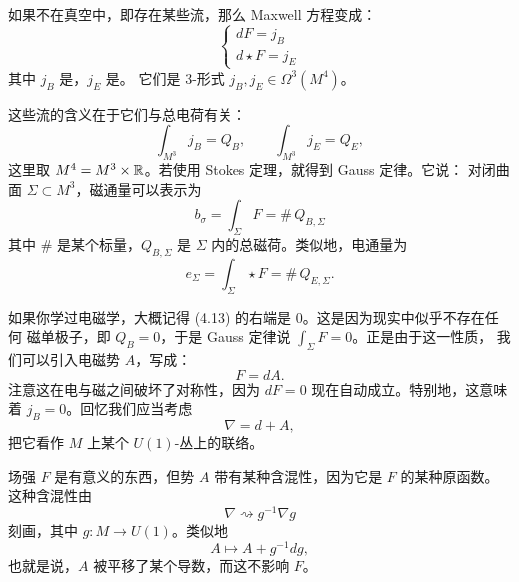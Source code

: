 如果不在真空中，即存在某些流，那么 Maxwell 方程变成：
\begin{equation}\tag{4.11}
\begin{cases}
dF=j_{B}\\
d\star F=j_{E}
\end{cases}
\end{equation}
其中 $j_{B}$ 是，$j_{E}$ 是。
它们是 3-形式 $j_{B},j_{E}\in\Omega^{3}(M^{4})$。

这些流的含义在于它们与总电荷有关：
\begin{equation}\tag{4.12}
\int_{M^{3}}j_{B}=Q_{B},
\qquad
\int_{M^{3}}j_{E}=Q_{E},
\end{equation}
这里取 $M^{4}=M^{3}\times\mathbb{R}$。若使用 Stokes 定理，就得到 Gauss 定律。它说：
对闭曲面 $\Sigma\subset M^{3}$，磁通量可以表示为
\begin{equation}\tag{4.13}
b_{\sigma}=\int_{\Sigma}F=\#\,Q_{B,\Sigma}
\end{equation}
其中 $\#$ 是某个标量，$Q_{B,\Sigma}$ 是 $\Sigma$ 内的总磁荷。类似地，电通量为
\begin{equation}\tag{4.14}
e_{\Sigma}=\int_{\Sigma}\star F=\#\,Q_{E,\Sigma}.
\end{equation}


如果你学过电磁学，大概记得 (4.13) 的右端是 0。这是因为现实中似乎不存在任何
磁单极子，即 $Q_{B}=0$，于是 Gauss 定律说 $\int_{\Sigma}F=0$。正是由于这一性质，
我们可以引入电磁势 $A$，写成：
\begin{equation}\tag{4.15}
F=dA.
\end{equation}
注意这在电与磁之间破坏了对称性，因为 $dF=0$ 现在自动成立。特别地，这意味着
$j_{B}=0$。回忆我们应当考虑
\begin{equation}\tag{4.16}
\nabla=d+A,
\end{equation}
把它看作 $M$ 上某个 $U(1)$-丛上的联络。

场强 $F$ 是有意义的东西，但势 $A$ 带有某种含混性，因为它是 $F$ 的某种原函数。
这种含混性由
\begin{equation}\tag{4.17}
\nabla\rightsquigarrow g^{-1}\nabla g
\end{equation}
刻画，其中 $g\colon M\to U(1)$。类似地
\begin{equation}\tag{4.18}
A\mapsto A+g^{-1}dg,
\end{equation}
也就是说，$A$ 被平移了某个导数，而这不影响 $F$。

